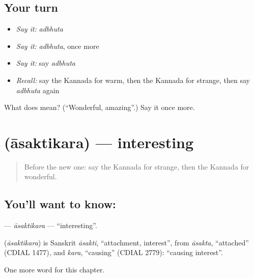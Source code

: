 \subsection*{Your turn}
\begin{itemize}
\raggedright
  \item \emph{Say it:} \emph{adbhuta}
  \item \emph{Say it:} \emph{adbhuta}, once more
  \item \emph{Say it:} say \emph{adbhuta}
  \item \emph{Recall:} say the Kannada for warm, then the Kannada for strange, then say \emph{adbhuta} again
\end{itemize}

\begin{tcolorbox}[breakable,colback=teal!4,colframe=teal!35!black,title={Before you move on}]
What does  mean? (\textquotedblleft{}Wonderful, amazing\textquotedblright{}.) Say it once more.
\end{tcolorbox}
\section[\texorpdfstring{\kn{ಆಸಕ್ತಿಕರ} (āsaktikara)}{ಆಸಕ್ತಿಕರ (āsaktikara)}]{ (āsaktikara) — interesting}

\label{lesson:KA-C291-asaktikara}



\begin{quote}
Before the new one: say the Kannada for strange, then the Kannada for wonderful.
\end{quote}

\subsection*{You'll want to know: }
\textbf{} — \emph{āsaktikara} — \textquotedblleft{}interesting\textquotedblright{}.

\begin{cousinweb}
\textbf{} (\emph{āsaktikara}) is Sanskrit \emph{āsakti}, \textquotedblleft{}attachment, interest\textquotedblright{}, from \emph{āsakta}, \textquotedblleft{}attached\textquotedblright{} (CDIAL 1477), and \emph{kara}, \textquotedblleft{}causing\textquotedblright{} (CDIAL 2779): \textquotedblleft{}causing interest\textquotedblright{}.
\end{cousinweb}

\begin{grammarlens}[title={What you've built}]
One more word for this chapter.
\end{grammarlens}

